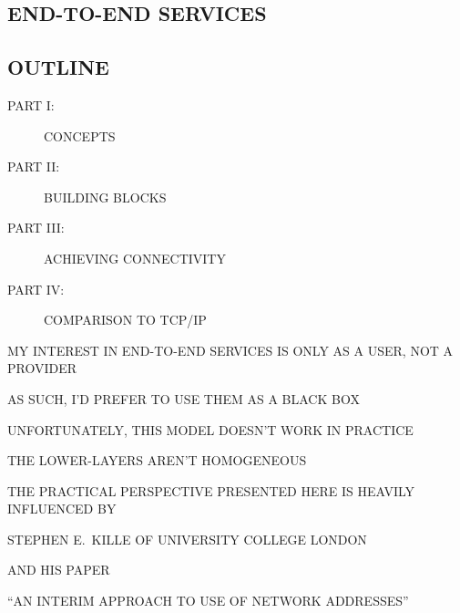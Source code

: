 
\begin{bwslide}
\part	{END-TO-END SERVICES}
\end{bwslide}
\doparts


\begin{bwslide}
\part*	{OUTLINE}\bf

\begin{description}
\item[PART I:]		CONCEPTS

\item[PART II:]		BUILDING BLOCKS

\item[PART III:]	ACHIEVING CONNECTIVITY

\item[PART IV:]		COMPARISON TO TCP/IP
\end{description}
\end{bwslide}


\begin{bwslide}

\begin{nrtc}
\item	MY INTEREST IN END-TO-END SERVICES IS ONLY AS A USER,
	NOT A PROVIDER

\item	AS SUCH, I'D PREFER TO USE THEM AS A BLACK BOX

\item	UNFORTUNATELY, THIS MODEL DOESN'T WORK IN PRACTICE
    \begin{nrtc}
    \item	THE LOWER-LAYERS AREN'T HOMOGENEOUS
    \end{nrtc}

\item	THE PRACTICAL PERSPECTIVE PRESENTED HERE IS HEAVILY INFLUENCED BY
    \begin{nrtc}
    \item	STEPHEN E.~KILLE OF UNIVERSITY COLLEGE LONDON
    \end{nrtc}

\item	AND HIS PAPER
    \begin{nrtc}
    \item	``AN INTERIM APPROACH TO USE OF NETWORK ADDRESSES''
    \end{nrtc}
\end{nrtc}
\end{bwslide}


